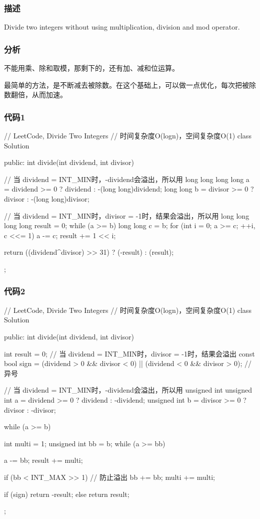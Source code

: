 \subsubsection{描述}
Divide two integers without using multiplication, division and mod operator.


\subsubsection{分析}
不能用乘、除和取模，那剩下的，还有加、减和位运算。

最简单的方法，是不断减去被除数。在这个基础上，可以做一点优化，每次把被除数翻倍，从而加速。


\subsubsection{代码1}
\begin{Code}
// LeetCode, Divide Two Integers
// 时间复杂度O(logn)，空间复杂度O(1)
class Solution {
public:
    int divide(int dividend, int divisor) {
        // 当 dividend = INT_MIN时，-dividend会溢出，所以用 long long
        long long a = dividend >= 0 ? dividend : -(long long)dividend;
        long long b = divisor >= 0 ? divisor : -(long long)divisor;

        // 当 dividend = INT_MIN时，divisor = -1时，结果会溢出，所以用 long long
        long long result = 0;
        while (a >= b) {
            long long c = b;
            for (int i = 0; a >= c; ++i, c <<= 1) {
                a -= c;
                result += 1 << i;
            }
        }

        return ((dividend^divisor) >> 31) ? (-result) : (result);
    }
};
\end{Code}


\subsubsection{代码2}
\begin{Code}
// LeetCode, Divide Two Integers
// 时间复杂度O(logn)，空间复杂度O(1)
class Solution {
public:
    int divide(int dividend, int divisor) {
        int result = 0; // 当 dividend = INT_MIN时，divisor = -1时，结果会溢出
        const bool sign = (dividend > 0 && divisor < 0) ||
                (dividend < 0 && divisor > 0); // 异号

        // 当 dividend = INT_MIN时，-dividend会溢出，所以用 unsigned int
        unsigned int a = dividend >= 0 ? dividend : -dividend;
        unsigned int b = divisor >= 0 ? divisor : -divisor;

        while (a >= b) {
            int multi = 1;
            unsigned int bb = b;
            while (a >= bb) {
                a -= bb;
                result += multi;

                if (bb < INT_MAX >> 1) { // 防止溢出
                    bb += bb;
                    multi += multi;
                }
            }
        }
        if (sign) return -result;
        else return result;
    }
};
\end{Code}


